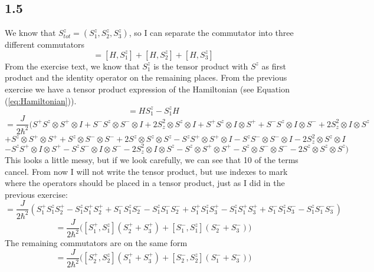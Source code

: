 \documentclass{scrartcl}
\begin{document}
\subsection*{1.5}
We know that $S_{tot}^z=(S_1^z,S_2^z,S_3^z)$, so I can separate the commutator into three different commutators
\begin{equation}
[H,S_{tot}^z]=[H,S_1^z]+[H,S_2^z]+[H,S_3^z]
\end{equation}
From the exercise text, we know that $S_1^z$ is the tensor product with $S^z$ as first product and the identity operator on the remaining places. From the previous exercise we have a tensor product expression of the Hamiltonian (see Equation (\ref{eq:Hamiltonian})).
\begin{equation*}
[H,S_1^z]=HS_1^z-S_1^zH
\end{equation*}
\begin{equation*}
=\frac{J}{2\hbar^2}(S^+S^z\otimes S^+\otimes I+S^-S^z\otimes S^-\otimes I+2S_z^2\otimes S^z\otimes I+S^+S^z\otimes I\otimes S^++S^-S^z\otimes I\otimes S^-+2S_z^2\otimes I\otimes S^z
\end{equation*}
\begin{equation*}
+S^z\otimes S^+\otimes S^++S^z\otimes S^-\otimes S^-+2S^z\otimes S^z\otimes S^z-S^zS^+\otimes S^+\otimes I-S^zS^-\otimes S^-\otimes I-2S_z^2\otimes S^z\otimes I
\end{equation*}
\begin{equation*}
-S^zS^+\otimes I\otimes S^+-S^zS^-\otimes I\otimes S^--2S_z^2\otimes I\otimes S^z-S^z\otimes S^+\otimes S^+-S^z\otimes S^-\otimes S^--2S^z\otimes S^z\otimes S^z)
\end{equation*}
This looks a little messy, but if we look carefully, we can see that 10 of the terms cancel. From now I will not write the tensor product, but use indexes to mark where the operators should be placed in a tensor product, just as I did in the previous exercise:
\begin{equation*}
[H,S_1^z]=\frac{J}{2\hbar^2}(S_1^+S_1^zS_2^+-S_1^zS_1^+S_2^++S_1^-S_1^zS_2^--S_1^zS_1^-S_2^-+S_1^+S_1^zS_3^+-S_1^zS_1^+S_3^++S_1^-S_1^zS_3^--S_1^zS_1^-S_3^-)
\end{equation*}
\begin{equation}
[H,S_1^z]=\frac{J}{2\hbar^2}\Big([S_1^+,S_1^z](S_2^++S_3^+)+[S_1^-,S_1^z](S_2^-+S_3^-)\Big)
\end{equation}
The remaining commutators are on the same form
\begin{equation}
[H,S_2^z]=\frac{J}{2\hbar^2}\Big([S_2^+,S_2^z](S_1^++S_3^+)+[S_2^-,S_2^z](S_1^-+S_3^-)\Big)
\end{equation}
\end{document}
